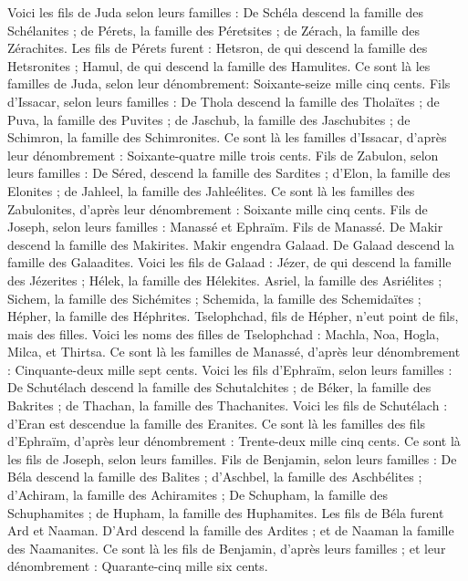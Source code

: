 \begin{multicols}{2}
Voici les fils de Juda selon leurs familles : De Schéla descend la famille des Schélanites ; de Pérets, la famille des Péretsites ; de Zérach, la famille des Zérachites.
Les fils de Pérets furent : Hetsron, de qui descend la famille des Hetsronites ; Hamul, de qui descend la famille des Hamulites.
Ce sont là les familles de Juda, selon leur dénombrement: Soixante-seize mille cinq cents.
Fils d'Issacar, selon leurs familles : De Thola descend la famille des Tholaïtes ; de Puva, la famille des Puvites ;
de Jaschub, la famille des Jaschubites ; de Schimron, la famille des Schimronites.
Ce sont là les familles d'Issacar, d’après leur dénombrement : Soixante-quatre mille trois cents.
Fils de Zabulon, selon leurs familles : De Séred, descend la famille des Sardites ; d'Elon, la famille des Elonites ; de Jahleel, la famille des Jahleélites.
Ce sont là les familles des Zabulonites, d’après leur dénombrement : Soixante mille cinq cents.
Fils de Joseph, selon leurs familles : Manassé et Ephraïm.
Fils de Manassé. De Makir descend la famille des Makirites. Makir engendra Galaad. De Galaad descend la famille des Galaadites.
Voici les fils de Galaad : Jézer, de qui descend la famille des Jézerites ; Hélek, la famille des Hélekites.
Asriel, la famille des Asriélites ; Sichem, la famille des Sichémites ;
Schemida, la famille des Schemidaïtes ; Hépher, la famille des Héphrites.
Tselophchad, fils de Hépher, n'eut point de fils, mais des filles. Voici les noms des filles de Tselophchad : Machla, Noa, Hogla, Milca, et Thirtsa.
Ce sont là les familles de Manassé, d’après leur dénombrement : Cinquante-deux mille sept cents.
Voici les fils d'Ephraïm, selon leurs familles : De Schutélach descend la famille des Schutalchites ; de Béker, la famille des Bakrites ; de Thachan, la famille des Thachanites.
Voici les fils de Schutélach : d’Eran est descendue la famille des Eranites.
Ce sont là les familles des fils d'Ephraïm, d’après leur dénombrement : Trente-deux mille cinq cents. Ce sont là les fils de Joseph, selon leurs familles.
Fils de Benjamin, selon leurs familles : De Béla descend la famille des Balites ; d'Aschbel, la famille des Aschbélites ; d'Achiram, la famille des Achiramites ;
De Schupham, la famille des Schuphamites ; de Hupham, la famille des Huphamites.
Les fils de Béla furent Ard et Naaman. D'Ard descend la famille des Ardites ; et de Naaman la famille des Naamanites.
Ce sont là les fils de Benjamin, d’après leurs familles ; et leur dénombrement : Quarante-cinq mille six cents.

\end{multicols}
